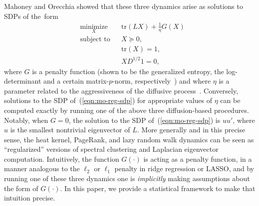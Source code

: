 \documentclass[12pt]{article}
\theoremstyle{plain}
\begin{document}
Mahoney and Orecchia showed that these three dynamics arise as solutions to 
SDPs of the~form
\begin{equation}
\begin{aligned}
  & \underset{X}{\text{minimize}}
  & & \mathrm{tr}(L X) + \tfrac{1}{\eta} G(X) \\
  & \text{subject to}
  & & X \succeq 0, \\
  & & & \mathrm{tr}(X) = 1, \\
  & & & X D^{1/2} 1 = 0,
\end{aligned}
\label{eqn:mo-reg-sdp}
\end{equation}
where $G$ is a penalty function (shown to be the 
generalized entropy, the log-determinant and a certain matrix-$p$-norm, 
respectively~\cite{mahoney2010implementing}) and where $\eta$ is a 
parameter related to the aggressiveness of the diffusive 
process~\cite{mahoney2010implementing}.  
Conversely, solutions to the SDP of~(\ref{eqn:mo-reg-sdp}) for appropriate 
values of $\eta$ can be computed exactly by running one of the above 
three diffusion-based procedures.
Notably, when $G = 0$, the solution to the SDP 
of~(\ref{eqn:mo-reg-sdp}) is $u u'$, where $u$ is the smallest nontrivial 
eigenvector of $L$.  
More generally and in this precise sense, the heat kernel, PageRank, and lazy 
random walk dynamics can be seen as ``regularized'' versions of spectral 
clustering and Laplacian eigenvector computation.
Intuitively, the function $G(\cdot)$ is acting as a penalty function, in a 
manner analogous to the $\ell_2$ or $\ell_1$ penalty in ridge regression or 
LASSO, and by running one of these three dynamics one is \emph{implicitly} 
making assumptions about the form of $G(\cdot)$.
In this paper, we provide a statistical framework to make that intuition 
precise.

\end{document}
